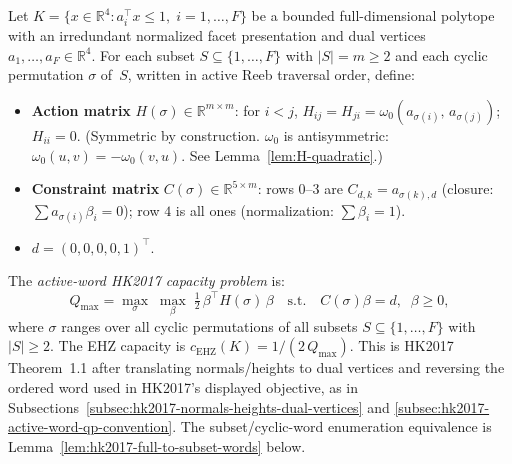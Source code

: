 
\begin{definition}\label{def:hk2017-problem}
Let $K = \{x \in \mathbb{R}^4 : a_i^\top x \leq 1,\; i = 1,\ldots,F\}$
be a bounded full-dimensional polytope with an irredundant normalized facet
presentation and dual vertices
$a_1, \ldots, a_F \in \mathbb{R}^4$.
For each subset $S \subseteq \{1, \ldots, F\}$ with $|S| = m \geq 2$
and each cyclic permutation $\sigma$ of~$S$, written in active Reeb traversal
order, define:
\begin{itemize}
  \item \textbf{Action matrix}
    $H(\sigma) \in \mathbb{R}^{m \times m}$:
    for $i < j$,\;
    $H_{ij} = H_{ji} = \omega_0(a_{\sigma(i)},\, a_{\sigma(j)})$;\;
    $H_{ii} = 0$.
    (Symmetric by construction.
    $\omega_0$ is antisymmetric: $\omega_0(u, v) = -\omega_0(v, u)$.
    See Lemma~\ref{lem:H-quadratic}.)
  \item \textbf{Constraint matrix}
    $C(\sigma) \in \mathbb{R}^{5 \times m}$:
    rows $0$--$3$ are $C_{d,k} = a_{\sigma(k),d}$
    (closure: $\sum a_{\sigma(i)} \beta_i = 0$);
    row $4$ is all ones
    (normalization: $\sum \beta_i = 1$).
  \item $d = (0, 0, 0, 0, 1)^\top$.
\end{itemize}
The \emph{active-word HK2017 capacity problem} is:
\begin{equation}\label{eq:hk2017-problem}
  Q_{\max}
  = \max_{\sigma}\;
    \max_{\beta}\;
    \tfrac{1}{2}\,\beta^\top H(\sigma)\, \beta
  \quad \text{s.t.} \quad
  C(\sigma)\beta = d, \;\; \beta \geq 0,
\end{equation}
where $\sigma$ ranges over all cyclic permutations of all subsets
$S \subseteq \{1, \ldots, F\}$ with $|S| \geq 2$.
The EHZ capacity is $c_{\mathrm{EHZ}}(K) = 1/(2\, Q_{\max})$.
This is HK2017 Theorem~1.1 after translating normals/heights to dual vertices
and reversing the ordered word used in HK2017's displayed objective, as in
Subsections~\ref{subsec:hk2017-normals-heights-dual-vertices} and
\ref{subsec:hk2017-active-word-qp-convention}.  The subset/cyclic-word
enumeration equivalence is Lemma~\ref{lem:hk2017-full-to-subset-words} below.
\end{definition}

